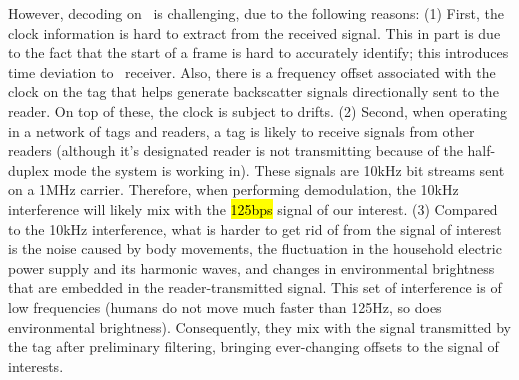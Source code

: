 However, decoding on \reader\ is challenging, due to the following reasons: (1) First, the clock information is hard to extract from the received signal. This in part is due to the fact that the start of a frame is hard to accurately identify; this introduces time deviation to \reader\ receiver. Also, there is a frequency offset associated with the clock on the tag that helps generate backscatter signals directionally sent to the reader. On top of these, the clock is subject to drifts. (2) Second, when operating in a network of tags and readers, a tag is likely to receive signals from other readers (although it's designated reader is not transmitting because of the half-duplex mode the system is working in). These signals are 10kHz bit streams sent on a 1MHz carrier. Therefore, when performing demodulation, the 10kHz interference will likely mix with the \hl{125bps} signal of our interest. (3) Compared to the 10kHz interference, what is harder to get rid of from the signal of interest is the noise caused by body movements, the fluctuation in the household electric power supply and its harmonic waves, and changes in environmental brightness that are embedded in the reader-transmitted signal. This set of interference is of low frequencies (humans do not move much faster than 125Hz, so does environmental brightness). Consequently, they mix with the signal transmitted by the tag after preliminary filtering, bringing ever-changing offsets to the signal of interests.

